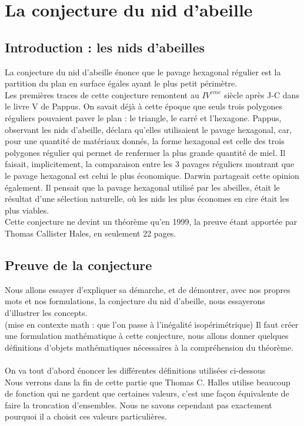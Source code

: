 \documentclass{book}
\begin{document}
\chapter{La conjecture du nid d'abeille}

\section{Introduction : les nids d'abeilles}
La conjecture du nid d'abeille énonce que le pavage hexagonal régulier est la partition du plan en surface égales ayant le plus petit périmètre.\\
Les premières traces de cette conjecture remontent au $IV^{\grave{e}me}$ siècle après J-C dans le livre V de Pappus. On savait déjà à cette époque que seuls trois polygones réguliers pouvaient paver le plan : le triangle, le carré et l'hexagone. Pappus, observant les nids d'abeille, déclara qu'elles utilisaient le pavage hexagonal, car, pour une quantité de matériaux donnés, la forme hexagonal est celle des trois polygones régulier qui permet de renfermer la plus grande quantité de miel. Il faisait, implicitement, la comparaison entre les 3 pavages réguliers montrant que le pavage hexagonal est celui le plus économique. Darwin partageait cette opinion également. Il pensait que la pavage hexagonal utilisé par les abeilles, était le résultat d'une sélection naturelle, où les nids les plus économes en cire était les plus viables.\\
Cette conjecture ne devint un théorème qu'en 1999, la preuve étant apportée par Thomas Callister Hales, en seulement 22 pages. 
\cite{thomas1}

\section{Preuve de la conjecture}
Nous allons essayer d'expliquer sa démarche, et de démontrer, avec nos propres mots et nos formulations, la conjecture du nid d'abeille, nous essayerons d'illustrer les concepts.\\
(mise en contexte math : que l'on passe à l'inégalité isopérimétrique)
Il faut créer une formulation mathématique à cette conjecture, nous allons donner quelques définitions d'objets mathématiques nécessaires à la compréhension du théorème.\\\\
On va tout d'abord énoncer les différentes définitions utilisées ci-dessous\\
Nous verrons dans la fin de cette partie que Thomas C. Halles utilise beaucoup de fonction qui ne gardent que certaines valeurs, c'est une façon équivalente de faire la troncation d'ensembles. Nous ne savons cependant pas exactement pourquoi il a choisit ces valeurs particulières.
\end{document}
